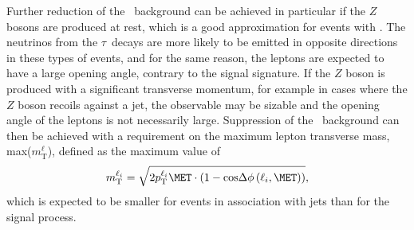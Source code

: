 Further reduction of the \Ztautau\ background can be achieved in particular if the $Z$ bosons are produced at rest, which is a good approximation for events with \ZeroJet. The neutrinos from the $\tau$~decays are more likely to be emitted in opposite directions in these types of events, and for the same reason, the leptons are expected to have a large opening angle, contrary to the signal signature.
If the $Z$ boson is produced with a significant transverse momentum, for example in cases where the $Z$ boson recoils against a jet, the \MET observable may be sizable and the opening angle of the leptons is not necessarily large. 
Suppression of the \Ztautau\ background can then be achieved with a requirement on the maximum lepton transverse mass, max($m_{\text{T}}^\ell$), defined as the maximum value of 
\begin{equation}
    m_{\text{T}}^{\ell_i} = \sqrt{ 2 p_\text{T}^{\ell_i} \MET \cdot \left( 1 - \text{cos} \Delta \phi \left( \ell_i, \MET \right) \right) }, 
\end{equation}
which is expected to be smaller for \Ztautau events in association with jets than for the signal process.


